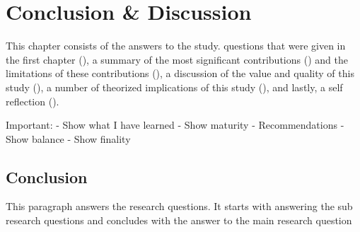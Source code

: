 \chapter{Conclusion \& Discussion}
\label{chap:conclusion}



This chapter consists of the answers to the study.
questions that were given in the first chapter (), 
a summary of the most significant contributions () and the limitations of these contributions (), 
a discussion of the value and quality of this study (),
a number of theorized implications of this study (),
and lastly, a self reflection ().

\begin{note}
  Important: 
  - Show what I have learned
  - Show maturity
  - Recommendations 
  - Show balance
  - Show finality
\end{note}


\section{Conclusion}
\label{sec:conclusion}

This paragraph answers the research questions. 
It starts with answering the sub research questions and concludes with the answer to the main research question

